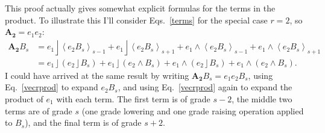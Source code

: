 \documentclass{utarticle}
\newcommand{\bl}[1]{\ensuremath{\bm{#1}}}
\DeclareMathOperator{\lin}{\rfloor}
\DeclareMathOperator{\out}{\wedge}
\newcommand{\grade}[2][]{\ensuremath{\left\langle #2 \right\rangle_{#1}}}
\begin{document}
This proof actually gives somewhat explicit formulas for the terms 
in the product.  To illustrate this I'll consider Eqs.~\eqref{terms} 
for the special case $r=2$, so $\bl{A_2} = e_1 e_2$:
\begin{align}
\bl{A_2} B_s & = e_1 \lin \grade[s-1]{e_2 B_s} + e_1 \lin \grade[s+1]
            {e_2 B_s} + e_1 \out \grade[s-1]{e_2 B_s} 
            + e_1 \out \grade[s+1]{e_2 B_s} \nonumber \\
 & =  e_1 \lin (e_2 \lin B_s) + e_1 \lin (e_2 \out B_s) + 
      e_1 \out (e_2 \lin B_s) + e_1 \out (e_2 \out B_s).
\end{align}
I could have arrived at the same result by writing $\bl{A_2} B_s = e_1 e_2
B_s$, using Eq.~\eqref{vecrprod} to expand $e_2 B_s$, and using 
Eq.~\eqref{vecrprod} again to expand the product of $e_1$ with each term.
The first term is of grade $s-2$, the middle two terms are of grade
$s$ (one grade lowering and one grade raising operation applied to
$B_s$), and the final term is of grade $s+2$.
\end{document}

